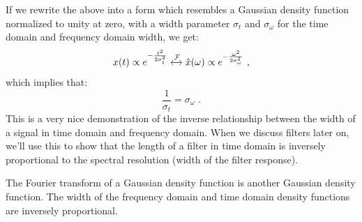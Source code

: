 If we rewrite the above into a form which resembles a Gaussian density function 
normalized to unity at zero, with a width parameter $\sigma_t$ and $\sigma_\omega$ for 
the time domain and frequency domain width, we get:
\begin{equation}
    x(t) \propto e^{-\frac{t^2}{2\sigma_t^2}} \xleftrightarrow{\mathcal{F}} \hat{x}(\omega) \propto e^{-\frac{\omega^2}{2\sigma_\omega^2}}\,\,,
\end{equation}
which implies that:
\begin{equation}
    \frac{1}{\sigma_t} = \sigma_\omega\,\,.
\end{equation}%
This is a very nice demonstration of the inverse relationship between the width of a 
signal in time domain and frequency domain.
When we discuss filters later on, we'll use this to show that the length of a filter 
in time domain is inversely proportional to the spectral resolution (width of the filter response).

\begin{marginfigure}
    \begin{center}

    \end{center}
    \caption{The Fourier transform of a Gaussian density function is another Gaussian density function. 
    The width of the frequency domain and time domain density functions are inversely proportional.}
    \label{fig:gaussftf}
\end{marginfigure}

